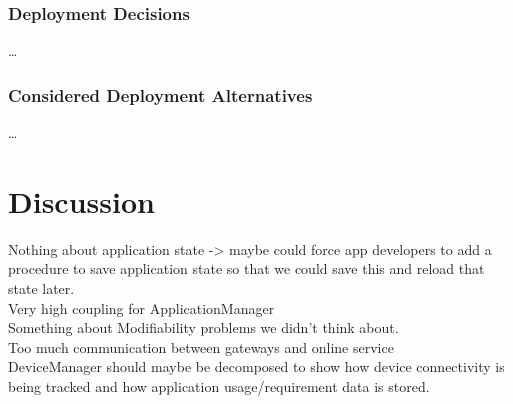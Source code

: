         \subsubsection*{Deployment Decisions}
            \ldots

        \subsubsection*{Considered Deployment Alternatives}
            \ldots

\section{Discussion}
    Nothing about application state -> maybe could force app developers to add a procedure to save application state so that we could save this and reload that state later.\\
    Very high coupling for ApplicationManager\\
    Something about Modifiability problems we didn't think about.\\
    Too much communication between gateways and online service\\
    DeviceManager should maybe be decomposed to show how device connectivity is being tracked and how application usage/requirement data is stored.

